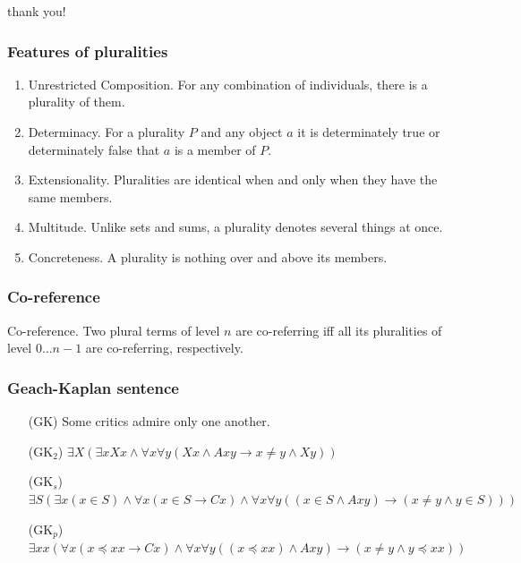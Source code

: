 \documentclass[serif]{beamer}
\newcommand{\among}{\preccurlyeq}
\begin{document}
\begin{frame}
\begin{center}
{\huge thank you!}
\end{center}
\end{frame}

\appendix

\setcounter{finalframe}{\value{framenumber}}

\begin{frame}
\frametitle{Features of pluralities}
{\small
\begin{enumerate}[i]
  \item \alert{Unrestricted Composition}. For any combination of individuals, there is a plurality of them.
  \item \alert{Determinacy}. For a plurality $P$ and any object $a$ it is determinately true or determinately false that $a$ is a member of $P$.
  \item \alert{Extensionality}. Pluralities are identical when and only when they have the same members.
  \item \alert{Multitude}. Unlike sets and sums, a plurality denotes several things at once.
  \item \alert{Concreteness}. A plurality is nothing over and above its members.
\end{enumerate}
}
\end{frame}

\begin{frame}
\frametitle{Co-reference}
\alert{Co-reference}. Two plural terms of level $n$ are co-referring iff all its pluralities of level $0\dots n-1$ are co-referring, respectively.
\end{frame}

\begin{frame}
\frametitle{Geach-Kaplan sentence}

\begin{enumerate}
  \item[(GK)] Some critics admire only one another.
  \item[(GK$_2$)] $\exists X (\exists x Xx \land \forall x \forall y (Xx \land Axy \to x \neq y \land Xy))$
  \item[(GK$_s$)] $\exists S (\exists x (x \in S) \land \forall x (x \in S \to Cx) \land \forall x \forall y ((x \in S \land Axy) \to (x \neq y \land y \in S)))$
  \item[(GK$_p$)] $\exists xx (\forall x (x \among xx \to Cx) \land \forall x \forall y ((x \among xx) \land Axy) \to (x \neq y \land y \among xx))$
\end{enumerate}

\end{frame}
\end{document}
